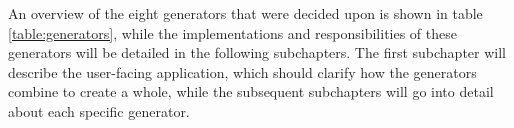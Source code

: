 An overview of the eight generators that were decided upon is shown in table \ref{table:generators}, while the implementations and responsibilities of these generators will be detailed in the following subchapters.
The first subchapter will describe the user-facing application, which should clarify how the generators combine to create a whole, while the subsequent subchapters will go into detail about each specific generator.











